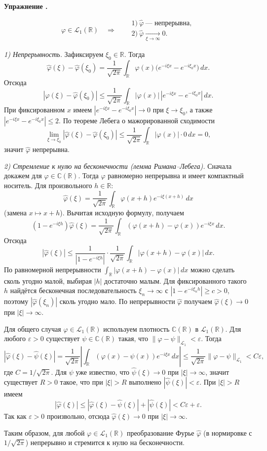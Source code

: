 \documentclass[11pt,a4paper]{report}
\numberwithin{equation}{section}
\numberwithin{figure}{chapter}
\numberwithin{table}{chapter}
\newif\ifinmathphysstatement
\newenvironment{myexe}[1][]{%
    \refstepcounter{exectr}%
    \inmathphysstatementtrue
    \begin{tcolorbox}[mathphysblock,colframe=exercisecolor,colback=exercisecolor!3,#1]
    \textbf{\color{exercisecolor}Упражнение \theexectr.}\par\smallskip
}{%
    \end{tcolorbox}
    \inmathphysstatementfalse
}
\newcommand{\R}{\mathbb{R}}
\newcommand{\C}{\mathbb{C}}
\renewcommand{\L}{\mathcal{L}}
\renewcommand{\phi}{\varphi}
\begin{document}
\begin{myexe}
    \[
\phi\in\L_1(\R) \quad \Rightarrow \quad
\begin{aligned}
&1)\ \widehat{\phi}\ \text{--- непрерывна},\\
&2)\ \widehat{\phi}\xrightarrow[\xi\to\infty]{}0.
\end{aligned}
\]

\textit{1) Непрерывность.}
Зафиксируем $\xi_0\in\R$. Тогда
\[
\hat\varphi(\xi)-\hat\varphi(\xi_0)
=\frac{1}{\sqrt{2\pi}}\int_{\R}\varphi(x)
\bigl(e^{-i\xi x}-e^{-i\xi_0 x}\bigr)\,dx.
\]
Отсюда
\[
|\hat\varphi(\xi)-\hat\varphi(\xi_0)|
\le
\frac{1}{\sqrt{2\pi}}\int_{\R}|\varphi(x)|\,
|e^{-i\xi x}-e^{-i\xi_0 x}|\,dx.
\]
При фиксированном $x$ имеем
$|e^{-i\xi x}-e^{-i\xi_0 x}|\to0$ при $\xi\to\xi_0$, а также
\(
|e^{-i\xi x}-e^{-i\xi_0 x}|\le2.
\)
По теореме Лебега о мажорированной сходимости
\[
\lim_{\xi\to\xi_0}|\hat\varphi(\xi)-\hat\varphi(\xi_0)|
\le
\frac{1}{\sqrt{2\pi}}
\int_{\R}|\varphi(x)|\cdot0\,dx=0,
\]
значит $\hat\varphi$ непрерывна.

\medskip

\textit{2) Стремление к нулю на бесконечности (лемма Римана–Лебега).}
Сначала докажем для $\varphi\in \C(\R)$.
Тогда $\varphi$ равномерно непрерывна и имеет компактный носитель.
Для произвольного $h\in\R$:
\[
\hat\varphi(\xi)
=\frac{1}{\sqrt{2\pi}}\int_{\R}\varphi(x+h)e^{-i\xi(x+h)}\,dx
\]
(замена $x\mapsto x+h$). Вычитая исходную формулу, получаем
\[
(1-e^{-i\xi h})\hat\varphi(\xi)
=\frac{1}{\sqrt{2\pi}}\int_{\R}
(\varphi(x+h)-\varphi(x))e^{-i\xi x}\,dx.
\]
Отсюда
\[
|\hat\varphi(\xi)|
\le
\frac{1}{|1-e^{-i\xi h}|}\cdot
\frac{1}{\sqrt{2\pi}}
\int_{\R}|\varphi(x+h)-\varphi(x)|\,dx.
\]
По равномерной непрерывности
\(
\int_{\R}|\varphi(x+h)-\varphi(x)|\,dx
\)
можно сделать сколь угодно малой, выбирая $|h|$ достаточно малым.
Для фиксированного такого $h$ найдётся бесконечная последовательность
$\xi_n\to\infty$ с $|1-e^{-i\xi_n h}|\ge c>0$, поэтому
$|\hat\varphi(\xi_n)|$ сколь угодно мало. По непрерывности $\hat\varphi$
получаем $\hat\varphi(\xi)\to0$ при $|\xi|\to\infty$.

Для общего случая $\varphi\in \L_1(\R)$ используем плотность
$\C(\R)$ в $\L_1(\R)$.
Для любого $\varepsilon>0$ существует $\psi\in \C(\R)$ такая, что
$\|\varphi-\psi\|_{\L_1}<\varepsilon$. Тогда
\[
|\hat\varphi(\xi)-\hat\psi(\xi)|
=
\frac{1}{\sqrt{2\pi}}
\left|\int_{\R}(\varphi(x)-\psi(x))e^{-i\xi x}\,dx\right|
\le
\frac{1}{\sqrt{2\pi}}\|\varphi-\psi\|_{\L_1}<C\varepsilon,
\]
где $C=1/\sqrt{2\pi}$. Для $\psi$ уже известно, что
$\hat\psi(\xi)\to0$ при $|\xi|\to\infty$, значит существует $R>0$ такое,
что при $|\xi|>R$ выполнено $|\hat\psi(\xi)|<\varepsilon$.
При $|\xi|>R$ имеем
\[
|\hat\varphi(\xi)|
\le|\hat\varphi(\xi)-\hat\psi(\xi)|+|\hat\psi(\xi)|
< C\varepsilon+\varepsilon.
\]
Так как $\varepsilon>0$ произвольно, отсюда
$\hat\varphi(\xi)\to0$ при $|\xi|\to\infty$.

Таким образом, для любой $\varphi\in \L_1(\R)$ преобразование Фурье
$\hat\varphi$ (в нормировке с $1/\sqrt{2\pi}$) непрерывно и стремится к
нулю на бесконечности.
\end{myexe}
\end{document}

